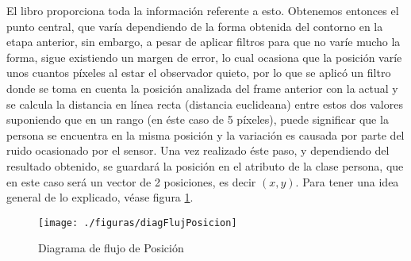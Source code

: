 \documentclass[a4paper,openright,12pt]{report}
\begin{document}
El libro \citep{Gonzalez2006} proporciona toda la información referente a esto. Obtenemos entonces el punto central, que varía dependiendo de la forma obtenida del contorno en la etapa anterior, sin embargo, a pesar de aplicar filtros para que no varíe mucho la forma, sigue existiendo un margen de error, lo cual ocasiona que la posición varíe unos cuantos píxeles al estar el observador quieto, por lo que se aplicó un filtro donde se toma en cuenta la posición analizada del frame anterior con la actual y se calcula la distancia en línea recta (distancia euclideana) entre estos dos valores suponiendo que en un rango (en éste caso de 5 píxeles), puede significar que la persona se encuentra en la misma posición y la variación es causada por parte del ruido ocasionado por el sensor. Una vez realizado éste paso, y dependiendo del resultado obtenido, se guardará la posición en el atributo de la clase persona, que en este caso será un vector de 2 posiciones, es decir $ (x,y) $. Para tener una idea general de lo explicado, véase figura \ref{fig:diagFlujPosicion}.
\begin{figure}[ht]
	\centering
	\texttt{[image: ./figuras/diagFlujPosicion]}
	\caption{Diagrama de flujo de Posición} \label{fig:diagFlujPosicion}
\end{figure}
\end{document}
